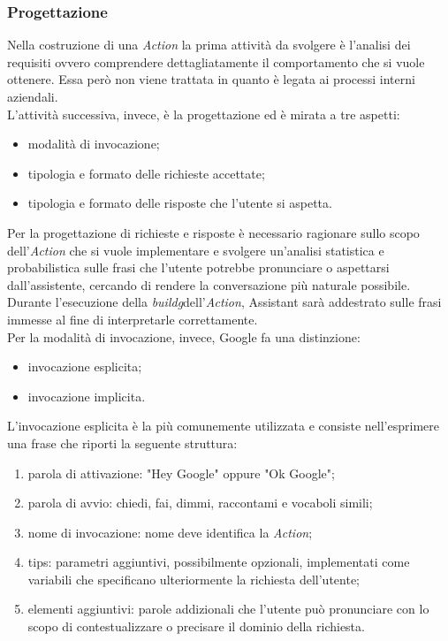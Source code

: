 		\subsubsection{Progettazione}
		Nella costruzione di una \emph{Action} la prima attività da svolgere è l'analisi dei requisiti ovvero comprendere dettagliatamente il comportamento che si vuole ottenere. Essa però non viene trattata in quanto è legata ai processi interni aziendali. \\
		L'attività successiva, invece, è la progettazione ed è mirata a tre aspetti:
		\begin{itemize}
			\item modalità di invocazione;
			\item tipologia e formato delle richieste accettate;
			\item tipologia e formato delle risposte che l'utente si aspetta.
		\end{itemize}
		Per la progettazione di richieste e risposte è necessario ragionare sullo scopo dell'\emph{Action} che si vuole implementare e svolgere un'analisi statistica e probabilistica sulle frasi che l'utente potrebbe pronunciare o aspettarsi dall'assistente, cercando di rendere la conversazione più naturale possibile. Durante l'esecuzione della \emph{\gls{buildg}}\glsfirstoccur dell'\emph{Action}, Assistant sarà addestrato sulle frasi immesse al fine di interpretarle correttamente. \\
		Per la modalità di invocazione, invece, Google fa una distinzione:
		\begin{itemize}
			\item invocazione esplicita;
			\item invocazione implicita.
		\end{itemize}
		L'invocazione esplicita è la più comunemente utilizzata e consiste nell'esprimere una frase che riporti la seguente struttura:
		\begin{enumerate}
			\item parola di attivazione: "Hey Google" oppure "Ok Google";
			\item parola di avvio: chiedi, fai, dimmi, raccontami e vocaboli simili;
			\item nome di invocazione: nome deve identifica la \emph{Action};
			\item tips: parametri aggiuntivi, possibilmente opzionali, implementati come variabili che specificano ulteriormente la richiesta dell'utente;
			\item elementi aggiuntivi: parole addizionali che l'utente può pronunciare con lo scopo di contestualizzare o precisare il dominio della richiesta.
		\end{enumerate}
